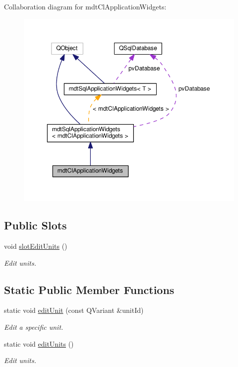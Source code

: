 Collaboration diagram for mdt\-Cl\-Application\-Widgets\-:
\nopagebreak
\begin{figure}[H]
\begin{center}
\leavevmode
\includegraphics[width=350pt]{classmdt_cl_application_widgets__coll__graph}
\end{center}
\end{figure}
\subsection*{Public Slots}
\begin{DoxyCompactItemize}
\item 
void \hyperlink{classmdt_cl_application_widgets_a2ae755a028947afe4ebf89a19029baf8}{slot\-Edit\-Units} ()
\begin{DoxyCompactList}\small\item\em Edit units. \end{DoxyCompactList}\end{DoxyCompactItemize}
\subsection*{Static Public Member Functions}
\begin{DoxyCompactItemize}
\item 
static void \hyperlink{classmdt_cl_application_widgets_a7abdfc14123af0dab942ee26a58f444d}{edit\-Unit} (const Q\-Variant \&unit\-Id)
\begin{DoxyCompactList}\small\item\em Edit a specific unit. \end{DoxyCompactList}\item 
static void \hyperlink{classmdt_cl_application_widgets_ac2aba225fcd32d36520a3d525368be34}{edit\-Units} ()
\begin{DoxyCompactList}\small\item\em Edit units. \end{DoxyCompactList}\end{DoxyCompactItemize}
